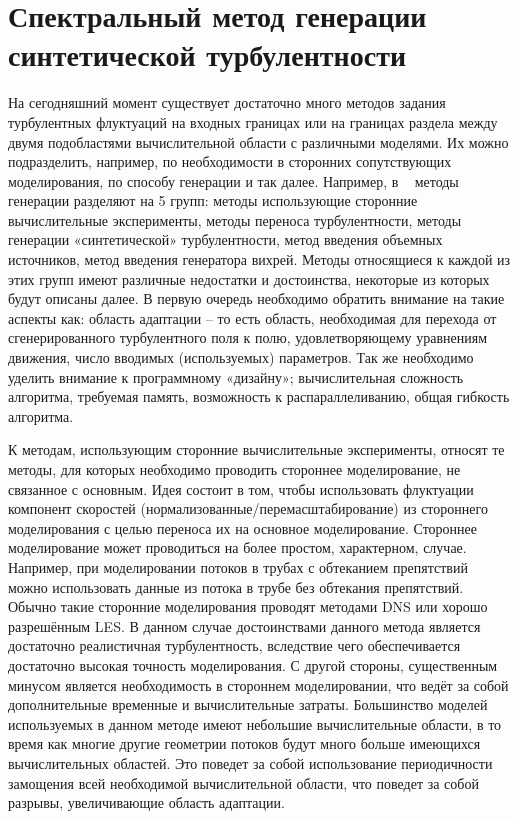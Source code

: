 \chapter{Спектральный метод генерации синтетической турбулентности} \label{chapt2}

На сегодняшний момент существует достаточно много методов задания турбулентных флуктуаций на входных границах или на границах раздела между двумя подобластями вычислительной области с различными моделями. Их можно подразделить, например, по необходимости в сторонних сопутствующих моделирования, по способу генерации и так далее. Например, в ~\cite{shur2014synthetic} методы генерации разделяют на 5 групп: методы использующие сторонние вычислительные эксперименты, методы переноса турбулентности, методы генерации «синтетической» турбулентности, метод введения объемных источников, метод введения генератора вихрей. Методы относящиеся к каждой из этих групп имеют различные недостатки и достоинства, некоторые из которых будут описаны далее. В первую очередь необходимо обратить внимание на такие аспекты как: область адаптации – то есть область, необходимая для перехода от сгенерированного турбулентного поля к полю, удовлетворяющему уравнениям движения, число вводимых (используемых) параметров. Так же необходимо уделить внимание к программному «дизайну»; вычислительная сложность алгоритма, требуемая память, возможность к распараллеливанию, общая гибкость алгоритма. 

К методам, использующим сторонние вычислительные эксперименты, относят те методы, для которых необходимо проводить стороннее моделирование, не связанное с основным. Идея состоит в том, чтобы использовать флуктуации компонент скоростей (нормализованные/перемасштабирование) из стороннего моделирования с целью переноса их на основное моделирование. Стороннее моделирование может проводиться на более простом, характерном, случае. Например, при моделировании потоков в трубах с обтеканием препятствий можно использовать данные из потока в трубе без обтекания препятствий. Обычно такие сторонние моделирования проводят методами DNS или хорошо разрешённым LES. В данном случае достоинствами данного метода является достаточно реалистичная турбулентность, вследствие чего обеспечивается достаточно высокая точность моделирования. С другой стороны, существенным минусом является необходимость в стороннем моделировании, что ведёт за собой дополнительные временные и вычислительные затраты. Большинство моделей используемых в данном методе имеют небольшие вычислительные области, в то время как многие другие геометрии потоков будут много больше имеющихся вычислительных областей. Это поведет за собой использование периодичности замощения всей необходимой вычислительной области, что поведет за собой разрывы, увеличивающие область адаптации. 

